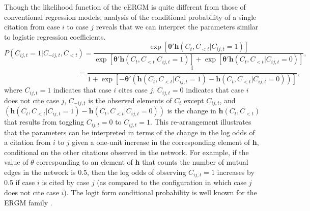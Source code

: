 \documentclass[headsepline=true, abstracton]{scrartcl}
\begin{document}
Though the likelihood function of the cERGM is quite different from those of conventional regression models, analysis of the conditional probability of a single citation from case $i$ to case $j$ reveals that we can interpret the parameters similar to logistic regression coefficients. $$ P(C_{ij,t} = 1 | C_{-ij,t}, C_{ < t}) = \frac{\exp \left[ {\bm{\theta}'\bm{h}(C_{t},C_{<t}| C_{ij,t} = 1) } \right]}{ \exp \left[ {\bm{\theta}'\bm{h}(C_{t},C_{<t}| C_{ij,t} = 1) } \right] + \exp \left[ {\bm{\theta}'\bm{h}(C_{t},C_{<t}| C_{ij,t} = 0) } \right]}, $$ $$ \text{~~~~~~~~~~~~~~~~~~~~~~~~~~~~~~~} = \frac{1}{ 1 + \exp \left[ - {\bm{\theta}'\left(\bm{h}(C_{t},C_{<t}| C_{ij,t} = 1) - \bm{h}(C_{t},C_{<t}| C_{ij,t} = 0)\right)} \right]}, $$
where $C_{ij,t} = 1$ indicates that case $i$ cites case $j$, $C_{ij,t} = 0$ indicates that case $i$ does not cite case $j$, $C_{-ij,t}$ is the observed elements of $C_{t}$ except $C_{ij,t}$, and $\left(\bm{h}(C_{t},C_{<t}| C_{ij,t} = 1) - \bm{h}(C_{t},C_{<t}| C_{ij,t} = 0)\right)$ is the change in $\bm{h}(C_{t},C_{<t})$ that results from toggling $C_{ij,t} = 0$ to $C_{ij,t} = 1$. This re-arrangement illustrates that the parameters can be interpreted in terms of the change in the log odds of a citation from $i$ to $j$ given a one-unit increase in the corresponding element of $\bm{h}$, conditional on the other citations observed in the network. For example, if the value of $\theta$ corresponding to an element of $\bm{h}$ that counts the number of mutual edges in the network is 0.5, then the log odds of observing $C_{ij,t} = 1$ increases by 0.5 if case $i$ is cited by case $j$ (as compared to the configuration in which case $j$ does not cite case $i$). The logit form conditional probability is well known for the ERGM family \citep{goodreau2009birds}. 
\end{document}
